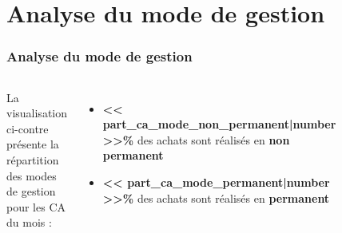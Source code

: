 \documentclass{beamer}
\begin{document}
    \section{Analyse du mode de gestion}

    \begin{frame}
        \tiny
        \frametitle{Analyse du mode de gestion}

        \begin{columns}
            La visualisation ci-contre présente la répartition des modes de gestion pour les CA du mois :

            \begin{itemize}
                \item \textbf{<< part_ca_mode_non_permanent|number >>\%} des achats sont réalisés en \textbf{non permanent}
                \item \textbf{<< part_ca_mode_permanent|number >>\%} des achats sont réalisés en \textbf{permanent}
            \end{itemize}

            \centering

            \begin{figure}
                \centering
                \includegraphics[width=1\textwidth]{assets/ca_total_par_mode_de_gestion}
            \end{figure}
        \end{columns}


\end{frame}
\end{document}
